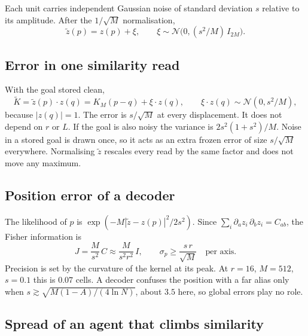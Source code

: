 \documentclass[11pt]{article}
\begin{document}
Each unit carries independent Gaussian noise of standard deviation $s$ relative to its amplitude.
After the $1/\sqrt{M}$ normalisation,
\begin{equation}
  \tilde z(p) = z(p) + \xi, \qquad \xi \sim \mathcal{N}\bigl(0, (s^2/M)\,I_{2M}\bigr).
\end{equation}

\subsection{Error in one similarity read}

With the goal stored clean,
\begin{equation}
  \tilde K = \tilde z(p)\cdot z(q) = K_M(p - q) + \xi\cdot z(q), \qquad
  \xi\cdot z(q) \sim \mathcal{N}(0, s^2/M),
\end{equation}
because $|z(q)| = 1$. The error is $s/\sqrt{M}$ at every displacement. It does not depend on
$r$ or $L$. If the goal is also noisy the variance is $2s^2(1+s^2)/M$. Noise in a stored goal is
drawn once, so it acts as an extra frozen error of size $s/\sqrt{M}$ everywhere. Normalising
$\tilde z$ rescales every read by the same factor and does not move any maximum.

\subsection{Position error of a decoder}

The likelihood of $p$ is $\exp(-M|\tilde z - z(p)|^2/2s^2)$. Since
$\sum_i \partial_a z_i\,\partial_b z_i = C_{ab}$, the Fisher information is
\begin{equation}
  J = \frac{M}{s^2}\,C \approx \frac{M}{s^2 r^2}\,I, \qquad
  \sigma_p \ge \frac{s\,r}{\sqrt{M}} \quad\text{per axis.}
\end{equation}
Precision is set by the curvature of the kernel at its peak. At $r = 16$, $M = 512$, $s = 0.1$
this is $0.07$ cells. A decoder confuses the position with a far alias only when
$s \gtrsim \sqrt{M(1 - A)/(4\ln N)}$, about $3.5$ here, so global errors play no role.

\subsection{Spread of an agent that climbs similarity}
\end{document}
